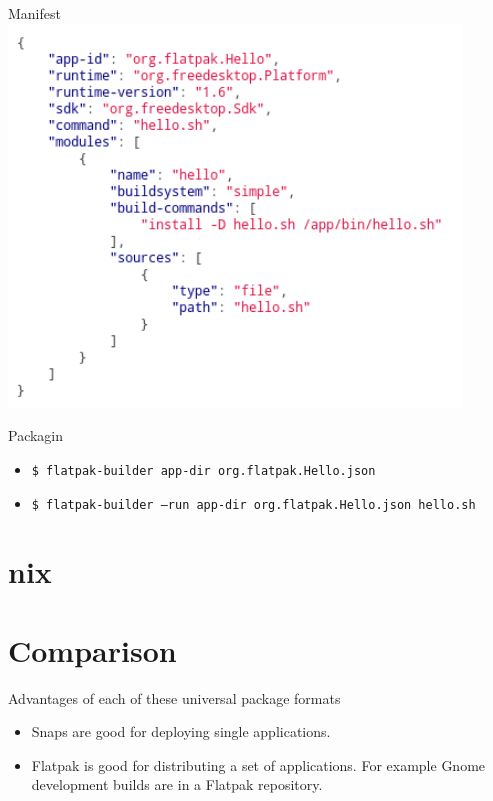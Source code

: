\documentclass{lug}
\begin{document}
\begin{frame}{Manifest}
    \center
    \includegraphics[width=0.9\textwidth]{./graphics/flatpak_json.png}
\end{frame}

\begin{frame}{Packagin}
    \begin{itemize}
        \item \texttt{\$\ flatpak-builder app-dir org.flatpak.Hello.json}
        \item \texttt{\$\ flatpak-builder --run app-dir org.flatpak.Hello.json hello.sh}
    \end{itemize}
\end{frame}


\section{nix}

\section{Comparison}
\begin{frame}{Advantages of each of these universal package formats}
    \begin{itemize}
        \item Snaps are good for deploying single applications.
        \item Flatpak is good for distributing a set of applications. For
            example Gnome development builds are in a Flatpak repository.
    \end{itemize}
\end{frame}
\end{document}
